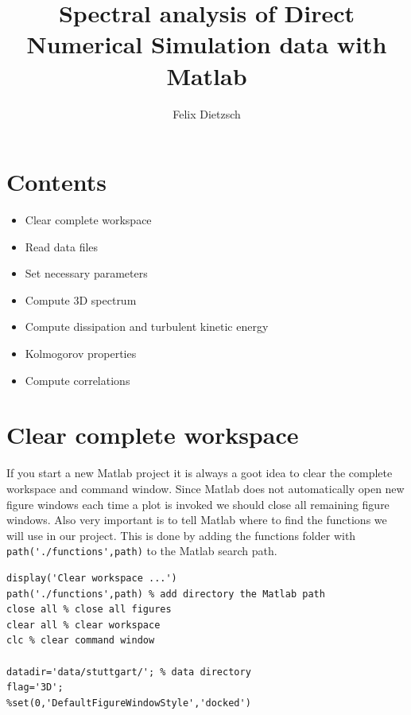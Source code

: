 \documentclass[preprint,12pt,ntfdMod]{elsarticle}
\author[rss]{Felix Dietzsch}
\title{Spectral analysis of Direct Numerical Simulation data with Matlab}
\begin{document}
		\maketitle 
		\hypersetup{linkcolor=black} 
		\tableofcontents

    
    
\section{Contents}

\begin{itemize}
\setlength{\itemsep}{-1ex}
   \item Clear complete workspace
   \item Read data files
   \item Set necessary parameters
   \item Compute 3D spectrum
   \item Compute dissipation and turbulent kinetic energy
   \item Kolmogorov properties
   \item Compute correlations
\end{itemize}


\section{Clear complete workspace}

\begin{par}

If you start a new Matlab project it is always a goot idea
to clear the complete workspace and command window.
Since Matlab does not automatically open new figure windows
each time a plot is invoked we should close
all remaining figure windows. Also very important is to tell
Matlab where to find the functions we will use in our project.
This is done by adding the functions folder with
\lstinline!path('./functions',path)! to the Matlab search
path.

\end{par} \vspace{1em}
\begin{verbatim}
display('Clear workspace ...')
path('./functions',path) % add directory the Matlab path
close all % close all figures
clear all % clear workspace
clc % clear command window

datadir='data/stuttgart/'; % data directory
flag='3D';
%set(0,'DefaultFigureWindowStyle','docked')
\end{verbatim}
\end{document}
